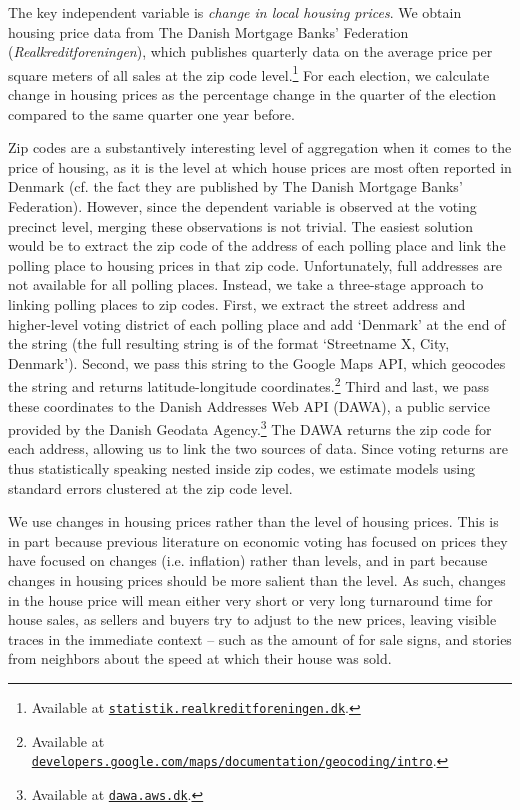 \documentclass[12pt,a4paper]{article}
\begin{document}
The key independent variable is \textit{change in local housing prices}. We obtain housing price data from The Danish Mortgage Banks' Federation (\textit{Realkreditforeningen}), which publishes quarterly data on the average price per square meters of all sales at the zip code level.\footnote{Available at \texttt{\href{http://statistik.realkreditforeningen.dk/}{statistik.realkreditforeningen.dk}}.} For each election, we calculate change in housing prices as the percentage change in the quarter of the election compared to the same quarter one year before. 

Zip codes are a substantively interesting level of aggregation when it comes to the price of housing, as it is the level at which house prices are most often reported in Denmark (cf. the fact they are published by The Danish Mortgage Banks' Federation). However, since the dependent variable is observed at the voting precinct level, merging these observations is not trivial. The easiest solution would be to extract the zip code of the address of each polling place and link the polling place to housing prices in that zip code. Unfortunately, full addresses are not available for all polling places. Instead, we take a three-stage approach to linking polling places to zip codes. First, we extract the street address and higher-level voting district of each polling place and add `Denmark' at the end of the string (the full resulting string is of the format `Streetname X, City, Denmark'). Second, we pass this string to the Google Maps API, which geocodes the string and returns latitude-longitude coordinates.\footnote{Available at \texttt{\href{https://developers.google.com/maps/documentation/geocoding/intro}{developers.google.com/maps/documentation/geocoding/intro}}.} Third and last, we pass these coordinates to the Danish Addresses Web API (DAWA), a public service provided by the Danish Geodata Agency.\footnote{Available at \texttt{\href{http://dawa.aws.dk/}{dawa.aws.dk}}.} The DAWA returns the zip code for each address, allowing us to link the two sources of data. Since voting returns are thus statistically speaking nested inside zip codes, we estimate models using standard errors clustered at the zip code level.

We use changes in housing prices rather than the level of housing prices. This is in part because previous literature on economic voting has focused on prices they have focused on changes (i.e. inflation) rather than levels, and in part because changes in housing prices should be more salient than the level. As such, changes in the house price will mean either very short or very long turnaround time for house sales, as sellers and buyers try to adjust to the new prices, leaving visible traces in the immediate context -- such as the amount of for sale signs, and stories from neighbors about the speed at which their house was sold.
\end{document}
